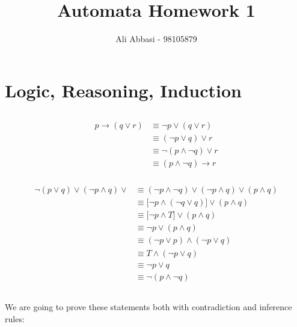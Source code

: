 \documentclass[11pt]{article}
\author{Ali Abbasi - 98105879}
\title{Automata Homework 1}
\begin{document}
\maketitle
\section{Logic, Reasoning, Induction}
\subsection{}
\subsubsection{}
\begin{align*}
p \to (q \lor r) &\equiv \neg p \lor (q \lor r)\\
&\equiv (\neg p \lor q) \lor r\\
& \equiv \neg (p \land \neg q) \lor r\\
&\equiv
(p \land \neg q) \to r
\end{align*}

\subsubsection{}
\begin{align*}
\neg (p \lor q) \lor (\neg p \land q) \lor
&\equiv (\neg p \land \neg q) \lor (\neg p \land q) \lor (p \land q)\tag{De Morgan}\\
&\equiv \biggl[\neg p \land (\neg q \lor q)\biggr] \lor (p \land q) \tag{Distributive}\\
&\equiv \bigl[\neg p \land T \bigr] \lor (p \land q)\\
&\equiv \neg p \lor (p \land q)\\
&\equiv (\neg p \lor p) \land (\neg p \lor q) \tag{Distributive}\\
&\equiv T \land (\neg p \lor q)\\
&\equiv \neg p \lor q\\
&\equiv \neg (p \land \neg q) \tag{De Morgan}
\end{align*}

\subsection{}
We are going to prove these statements both with contradiction and inference rules:
\end{document}
